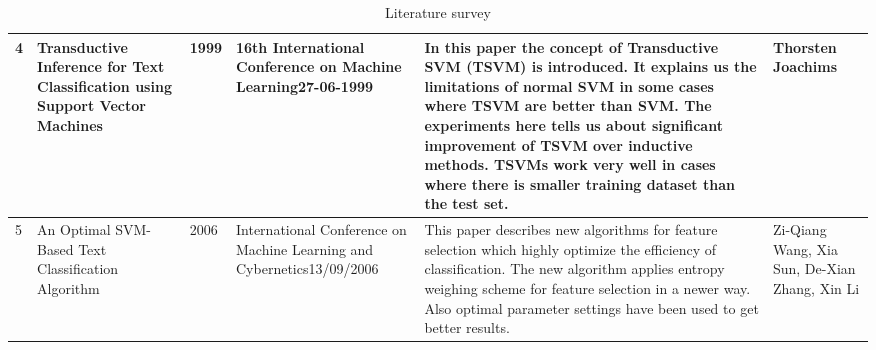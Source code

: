 \documentclass{report}
\begin{document}
\begin{table}[!h]
\begin{tabular}{|p{0.6cm}|p{2.5cm}|p{0.6cm}|p{3.3cm}|p{5.1cm}|p{2.0cm}|}
4              & Transductive Inference for Text Classification using Support Vector Machines   & 1999          & 16th International Conference on Machine Learning27-06-1999                                                   & In this paper the concept of Transductive SVM (TSVM)  is introduced. It explains us the limitations of normal SVM in some cases where TSVM are better than SVM. The experiments here tells us about significant improvement of TSVM over inductive methods. TSVMs work very well in cases where there is smaller training dataset than the test set.                & Thorsten Joachims                                     \\ \hline
5              & An Optimal SVM-Based Text Classification Algorithm                             & 2006          & International Conference on Machine Learning and Cybernetics13/09/2006                                        & This paper describes new algorithms for feature selection which highly optimize the efficiency of classification. The new algorithm applies entropy weighing scheme for feature selection in a newer way. Also optimal parameter settings have been used to get better results.                                                                                     & Zi-Qiang Wang, Xia Sun, De-Xian Zhang, Xin Li         \\ \hline
\end{tabular}
\caption{Literature survey}
\end{table}
\pagebreak

\end{document}
